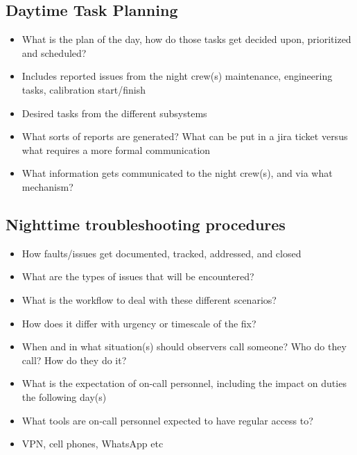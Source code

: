 \documentclass[SE,authoryear,toc]{lsstdoc}
\begin{document}
\subsection{Daytime Task Planning}
\begin{itemize}
\item What is the plan of the day, how do those tasks get decided upon, prioritized and scheduled?
\item Includes reported issues from the night crew(s) maintenance, engineering tasks, calibration start/finish
\item Desired tasks from the different subsystems
\item What sorts of reports are generated? What can be put in a jira ticket versus what requires a more formal communication
\item What information gets communicated to the night crew(s), and via what mechanism?
\end{itemize}

\subsection{Nighttime troubleshooting procedures}
\begin{itemize}
\item How faults/issues get documented, tracked, addressed, and closed
\item What are the types of issues that will be encountered?
\item What is the workflow to deal with these different scenarios?
\item How does it differ with urgency or timescale of the fix?
\item When and in what situation(s) should observers call someone? Who do they call? How do they do it? 
\item What is the expectation of on-call personnel, including the impact on duties the following day(s)
\item What tools are on-call personnel expected to have regular access to?
\item VPN, cell phones, WhatsApp etc
\end{itemize}
\end{document}
